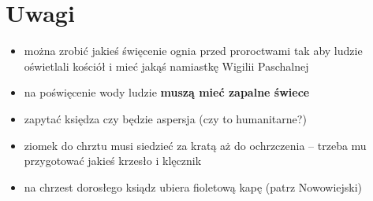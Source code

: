 \color{red}

\section{Uwagi}
\begin{itemize}
      \item można zrobić jakieś święcenie ognia przed proroctwami tak aby ludzie
            oświetlali kościół i mieć jakąś namiastkę Wigilii Paschalnej
      \item na poświęcenie wody ludzie \textbf{muszą mieć zapalne świece}
      \item zapytać księdza czy będzie aspersja (czy to humanitarne?)
      \item ziomek do chrztu musi siedzieć za kratą aż do ochrzczenia -- trzeba
            mu przygotować jakieś krzesło i klęcznik 
      \item na chrzest dorosłego ksiądz ubiera fioletową kapę (patrz Nowowiejski)
\end{itemize}